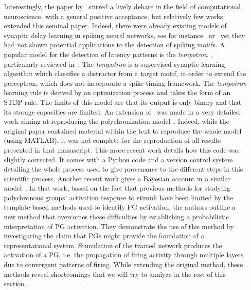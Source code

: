 \documentclass[brainsci, %
               review,submit,pdftex,moreauthors
               ]{Definitions/mdpi}
\begin{document}
Interestingly, the paper by~\citep{izhikevich_polychronization_2006} stirred a lively debate in the field of computational neuroscience, with a general positive acceptance, but relatively few works extended this seminal paper. Indeed, there were already existing models of synaptic delay learning in spiking neural networks, see for instance~\citep{huning_synaptic_1998} or~\citep{eurich_dynamics_1999} yet they had not shown potential applications to the detection of spiking motifs. A popular model for the detection of latency patterns is the \emph{tempotron}~\citep{gutig_tempotron_2006}, particularly reviewed in~\citep{gutig_spike_2014}. The \emph{tempotron} is a supervised synaptic learning algorithm which classifies a distractor from a target motif, in order to extend the perceptron, which does not incorporate a spike timing framework. The \emph{tempotron} learning rule is derived by an optimization process and takes the form of an STDP rule. The limits of this model are that its output is only binary and that its storage capacities are limited. An extension of~\citep{izhikevich_polychronization_2006} was made in a very detailed work aiming at reproducing the polychronization model~\citep{pauli_reproducing_2018}. Indeed, while the original paper contained material within the text to reproduce the whole model (using MATLAB), it was not complete for the reproduction of all results presented in that manuscript. This more recent work details how this code was slightly corrected. It comes with a Python code and a version control system detailing the whole process used to give provenance to the different steps in this scientific process. Another recent work gives a Bayesian account in a similar model~\citep{guise_bayesian_2014}. In that work, based on the fact that previous methods for studying polychronous groups' activation response to stimuli have been limited by the template-based methods used to identify PG activation, the authors outline a new method that overcomes these difficulties by establishing a probabilistic interpretation of PG activation. They demonstrate the use of this method by investigating the claim that PGs might provide the foundation of a representational system. Stimulation of the trained network produces the activation of a PG, i.e. the propagation of firing activity through multiple layers due to convergent patterns of firing. While extending the original method, these methods reveal shortcomings that we will try to analyze in the rest of this section.
\end{document}
